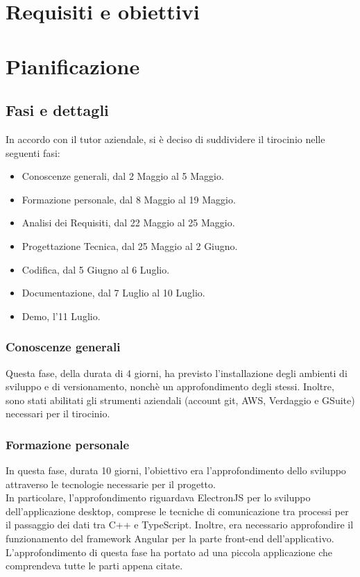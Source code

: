 \section{Requisiti e obiettivi}


\section{Pianificazione}

\subsection{Fasi e dettagli}

In accordo con il tutor aziendale, si è deciso di suddividere il tirocinio nelle seguenti fasi:
\begin{itemize}
    \item Conoscenze generali, dal 2 Maggio al 5 Maggio.
    \item Formazione personale, dal 8 Maggio al 19 Maggio.
    \item Analisi dei Requisiti, dal 22 Maggio al 25 Maggio.
    \item Progettazione Tecnica, dal 25 Maggio al 2 Giugno.
    \item Codifica, dal 5 Giugno al 6 Luglio.
    \item Documentazione, dal 7 Luglio al 10 Luglio.
    \item Demo, l'11 Luglio.
\end{itemize}

\subsubsection{Conoscenze generali}
Questa fase, della durata di 4 giorni, ha previsto l'installazione degli ambienti di sviluppo e di versionamento, nonchè un approfondimento degli stessi. Inoltre, sono stati abilitati gli strumenti aziendali (account git, AWS, Verdaggio e GSuite) necessari per il tirocinio.
\subsubsection{Formazione personale}
In questa fase, durata 10 giorni, l'obiettivo era l'approfondimento dello sviluppo attraverso le tecnologie necessarie per il progetto.\\
In particolare, l'approfondimento riguardava ElectronJS per lo sviluppo dell'applicazione desktop, comprese le tecniche di comunicazione tra processi per il passaggio dei dati tra C++ e TypeScript. Inoltre, era necessario approfondire il funzionamento del framework Angular per la parte front-end dell'applicativo.\\
L'approfondimento di questa fase ha portato ad una piccola applicazione che comprendeva tutte le parti appena citate.
